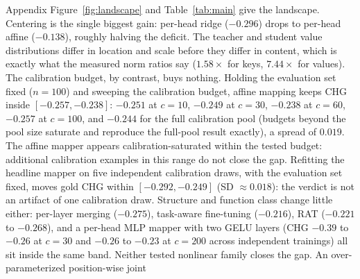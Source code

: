 \documentclass{article} %
\begin{document}
Appendix Figure~\ref{fig:landscape} and Table~\ref{tab:main} give the landscape.
Centering is the single biggest gain: per-head ridge ($-0.296$) drops to
per-head affine ($-0.138$), roughly halving the deficit. The teacher and
student value distributions differ in location and scale before they differ
in content, which is exactly what the measured norm ratios say ($1.58\times$
for keys, $7.44\times$ for values). The calibration budget, by contrast,
buys nothing. Holding the evaluation set fixed ($n{=}100$) and sweeping the
calibration budget, affine mapping keeps CHG
inside $[-0.257, -0.238]$: $-0.251$ at $c{=}10$, $-0.249$ at $c{=}30$,
$-0.238$ at $c{=}60$, $-0.257$ at $c{=}100$, and $-0.244$ for the full
calibration pool (budgets beyond the pool size saturate and reproduce the
full-pool result exactly), a spread of $0.019$. The affine mapper appears
calibration-saturated within the tested budget: additional calibration examples
in this range do not close the gap. Refitting the headline
mapper on five independent calibration draws, with the evaluation set fixed,
moves gold CHG within $[-0.292, -0.249]$ (SD $\approx 0.018$): the verdict
is not an artifact of one calibration draw. Structure and function
class change little either: per-layer merging ($-0.275$), task-aware
fine-tuning ($-0.216$), RAT ($-0.221$ to $-0.268$), and a per-head MLP mapper
with two GELU layers (CHG $-0.39$ to $-0.26$ at $c{=}30$ and $-0.26$ to
$-0.23$ at $c{=}200$ across independent trainings) all sit inside the same
band. Neither tested nonlinear family closes the gap. An over-parameterized
position-wise joint
\end{document}
